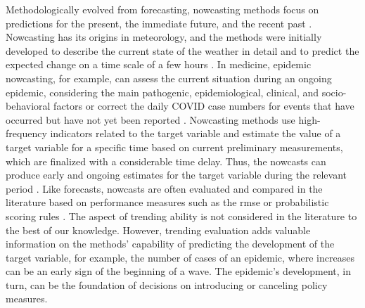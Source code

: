 Methodologically evolved from forecasting, nowcasting methods focus on predictions for the present, the immediate future, and the recent past \citep{banbura2013now}.
Nowcasting has its origins in meteorology, and the methods were initially developed to describe the current state of the weather in detail and to predict the expected change on a time scale of a few hours \citep{browning1989nowcasting,schmid2019nowcasting}. 
In medicine, epidemic nowcasting, for example, can assess the current situation during an ongoing epidemic, considering the main pathogenic, epidemiological, clinical, and socio-behavioral factors \citep{wu2021nowcasting} or correct the daily COVID case numbers for events that have occurred but have not yet been reported \citep{gunther2021nowcasting}. 
Nowcasting methods use high-frequency indicators related to the target variable and estimate the value of a target variable for a specific time based on current preliminary measurements, which are finalized with a considerable time delay. 
Thus, the nowcasts can produce early and ongoing estimates for the target variable during the relevant period \citep{castle2017forecasting}. 
Like forecasts, nowcasts are often evaluated and compared in the literature based on performance measures such as the \ac{rmse} \citep{gunther2021nowcasting} or probabilistic scoring rules \citep{Wolffram2023}. 
The aspect of trending ability is not considered in the literature to the best of our knowledge. 
However, trending evaluation adds valuable information on the methods' capability of predicting the development of the target variable, for example, the number of cases of an epidemic, where increases can be an early sign of the beginning of a wave.
The epidemic's development, in turn, can be the foundation of decisions on introducing or canceling policy measures. 

